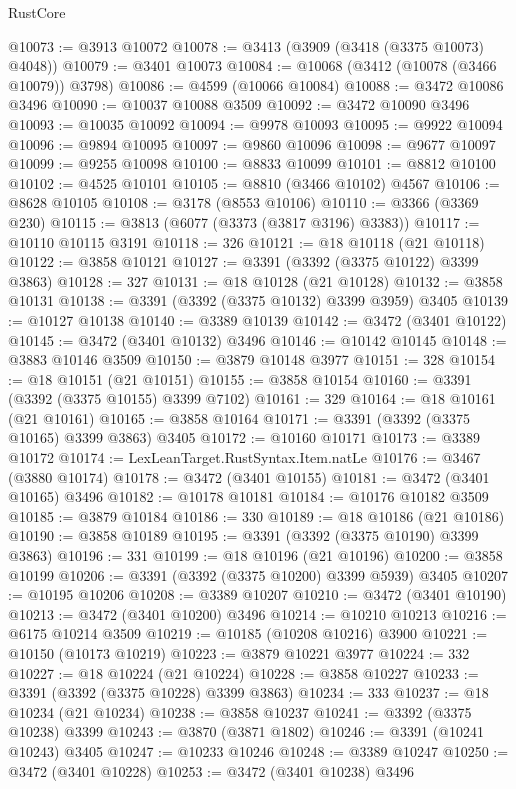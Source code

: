 \begin{lexlean}{RustCore}
\begin{coremodule}
@10073 := @3913 @10072
@10078 := @3413 (@3909 (@3418 (@3375 @10073) @4048))
@10079 := @3401 @10073
@10084 := @10068 (@3412 (@10078 (@3466 @10079)) @3798)
@10086 := @4599 (@10066 @10084)
@10088 := @3472 @10086 @3496
@10090 := @10037 @10088 @3509
@10092 := @3472 @10090 @3496
@10093 := @10035 @10092
@10094 := @9978 @10093
@10095 := @9922 @10094
@10096 := @9894 @10095
@10097 := @9860 @10096
@10098 := @9677 @10097
@10099 := @9255 @10098
@10100 := @8833 @10099
@10101 := @8812 @10100
@10102 := @4525 @10101
@10105 := @8810 (@3466 @10102) @4567
@10106 := @8628 @10105
@10108 := @3178 (@8553 @10106)
@10110 := @3366 (@3369 @230)
@10115 := @3813 (@6077 (@3373 (@3817 @3196) @3383))
@10117 := @10110 @10115 @3191
@10118 := 326
@10121 := @18 @10118 (@21 @10118)
@10122 := @3858 @10121
@10127 := @3391 (@3392 (@3375 @10122) @3399 @3863)
@10128 := 327
@10131 := @18 @10128 (@21 @10128)
@10132 := @3858 @10131
@10138 := @3391 (@3392 (@3375 @10132) @3399 @3959) @3405
@10139 := @10127 @10138
@10140 := @3389 @10139
@10142 := @3472 (@3401 @10122)
@10145 := @3472 (@3401 @10132) @3496
@10146 := @10142 @10145
@10148 := @3883 @10146 @3509
@10150 := @3879 @10148 @3977
@10151 := 328
@10154 := @18 @10151 (@21 @10151)
@10155 := @3858 @10154
@10160 := @3391 (@3392 (@3375 @10155) @3399 @7102)
@10161 := 329
@10164 := @18 @10161 (@21 @10161)
@10165 := @3858 @10164
@10171 := @3391 (@3392 (@3375 @10165) @3399 @3863) @3405
@10172 := @10160 @10171
@10173 := @3389 @10172
@10174 := LexLeanTarget.RustSyntax.Item.natLe
@10176 := @3467 (@3880 @10174)
@10178 := @3472 (@3401 @10155)
@10181 := @3472 (@3401 @10165) @3496
@10182 := @10178 @10181
@10184 := @10176 @10182 @3509
@10185 := @3879 @10184
@10186 := 330
@10189 := @18 @10186 (@21 @10186)
@10190 := @3858 @10189
@10195 := @3391 (@3392 (@3375 @10190) @3399 @3863)
@10196 := 331
@10199 := @18 @10196 (@21 @10196)
@10200 := @3858 @10199
@10206 := @3391 (@3392 (@3375 @10200) @3399 @5939) @3405
@10207 := @10195 @10206
@10208 := @3389 @10207
@10210 := @3472 (@3401 @10190)
@10213 := @3472 (@3401 @10200) @3496
@10214 := @10210 @10213
@10216 := @6175 @10214 @3509
@10219 := @10185 (@10208 @10216) @3900
@10221 := @10150 (@10173 @10219)
@10223 := @3879 @10221 @3977
@10224 := 332
@10227 := @18 @10224 (@21 @10224)
@10228 := @3858 @10227
@10233 := @3391 (@3392 (@3375 @10228) @3399 @3863)
@10234 := 333
@10237 := @18 @10234 (@21 @10234)
@10238 := @3858 @10237
@10241 := @3392 (@3375 @10238) @3399
@10243 := @3870 (@3871 @1802)
@10246 := @3391 (@10241 @10243) @3405
@10247 := @10233 @10246
@10248 := @3389 @10247
@10250 := @3472 (@3401 @10228)
@10253 := @3472 (@3401 @10238) @3496

\end{coremodule}
\end{lexlean}
